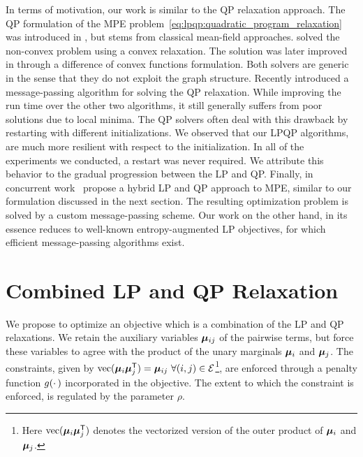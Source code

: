 In terms of motivation, our work is similar to the \ac{QP} 
relaxation approach. The \ac{QP} formulation of the \ac{MPE} problem~\eqref{eq:lpqp:quadratic_program_relaxation}
was introduced in \parencite{Ravikumar2006}, 
but stems from classical mean-field approaches. 
\textcite{Ravikumar2006} solved the non-convex problem
using a convex relaxation. The solution was later improved in \parencite{Kappes2008} 
through a difference of convex functions formulation. Both solvers
are generic in the sense that they do not exploit the graph structure.
Recently \parencite{Kumar2011} introduced a
message-passing algorithm for solving the \ac{QP} relaxation. While improving the 
run time over the other two algorithms, it still generally suffers from poor 
solutions due to local minima.  The \ac{QP} solvers often deal with this drawback 
by restarting with different initializations.
We observed that our \ac{LPQP} algorithms, are much more resilient with respect to 
the initialization. In all of the experiments we conducted, a restart was never required.
We attribute this behavior to the gradual progression between the \ac{LP} and
\ac{QP}.
Finally, in concurrent work~\parencite{Kumar2012} propose a 
hybrid \ac{LP} and \ac{QP} approach to \ac{MPE}, similar to our formulation discussed in the
next section. The resulting optimization problem is solved by a custom
message-passing scheme. Our work on the other hand, in its essence reduces to 
well-known entropy-augmented \ac{LP} objectives, for which efficient
message-passing algorithms exist.


\section{Combined LP and QP Relaxation}

We propose to optimize an objective which is a combination of the \ac{LP} and
\ac{QP}
relaxations. We retain the auxiliary variables $\bm{\mu}_{ij}$ of the
pairwise terms, but force these variables to agree with the 
product of the unary marginals $\bm{\mu}_i$ and $\bm{\mu}_j$. The
constraints, given by $\mathrm{vec}(\bm{\mu}_{i} \bm{\mu}_{j}^{\mathsf{T}}) =
\bm{\mu}_{ij} \ \forall (i,j) \in \mathcal{E}$\footnote{Here
$\mathrm{vec}(\bm{\mu}_{i}\bm{\mu}_{j}^{\mathsf{T}})$ denotes the
vectorized version of the outer product of $\bm{\mu}_{i}$ and
$\bm{\mu}_{j}$.}, are enforced through a penalty function
$g(\cdotp)$ incorporated in the objective. The extent to which
the constraint is enforced, is regulated by the parameter $\rho$.


